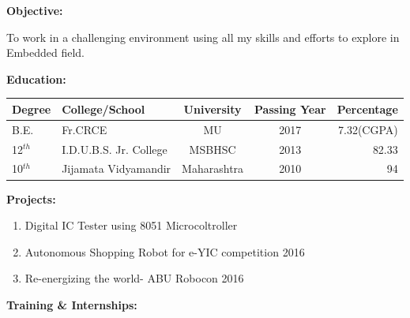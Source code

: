 \documentclass[a4paper]{article}
\begin{document}
	\vspace{-3mm}
 \begin{flushleft}
 	\begin{Large}\textbf{Objective:}\end{Large} \hspace{0.05in} To work in a challenging environment using all my skills and efforts to explore in Embedded field.\\
 	\begin{Large}\vspace{0.3in}\textbf{Education:}\end{Large}
 	\vspace{-3mm}
 	\begin{center}
 	\begin{tabular}{|l|l|c|c|r|}
 	\hline
 	Degree & College/School & University & Passing Year & Percentage\\ \hline
 
 	B.E. & Fr.CRCE & MU & 2017 & 7.32(CGPA)\\ \hline
 
 	12$^{th}$ & I.D.U.B.S. Jr. College & MSBHSC & 2013 & 82.33\\ \hline
 
	10$^{th}$ & Jijamata Vidyamandir & Maharashtra & 2010 & 94\\ \hline

 	\end{tabular}
    \end{center}
    
  
  	\begin{Large}\vspace{0.1in}\textbf{Projects:}\end{Large}
  	\begin{enumerate}
  		\item Digital IC Tester using 8051 Microcoltroller
  		\item Autonomous Shopping Robot for e-YIC competition 2016
  		\item Re-energizing the world- ABU Robocon 2016
  	\end{enumerate}
  	
  
	  	\begin{Large}\vspace{0.1in}\textbf{Training \& Internships:}\end{Large}\\
	  	\begin{itemize}
	  		

\end{itemize}
\end{flushleft}
\end{document}
